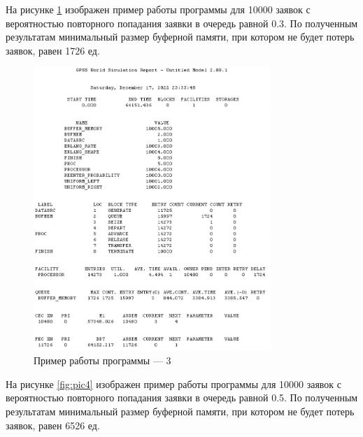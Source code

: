 \documentclass[12pt]{report}
\begin{document}
На рисунке \ref{fig:pic3} изображен пример работы программы для 10000 заявок с вероятностью повторного попадания заявки в очередь равной 0.3. По полученным результатам минимальный размер буферной памяти, при котором не будет потерь заявок, равен 1726 ед.

\begin{figure}[h!btp]
	\centering
	\includegraphics[width=0.8\textwidth]{inc/pic3.png}
	\caption{Пример работы программы --- 3}
	\label{fig:pic3}	
\end{figure}
\clearpage

На рисунке \ref{fig:pic4} изображен пример работы программы для 10000 заявок с вероятностью повторного попадания заявки в очередь равной 0.5. По полученным результатам минимальный размер буферной памяти, при котором не будет потерь заявок, равен 6526 ед.
\end{document}
